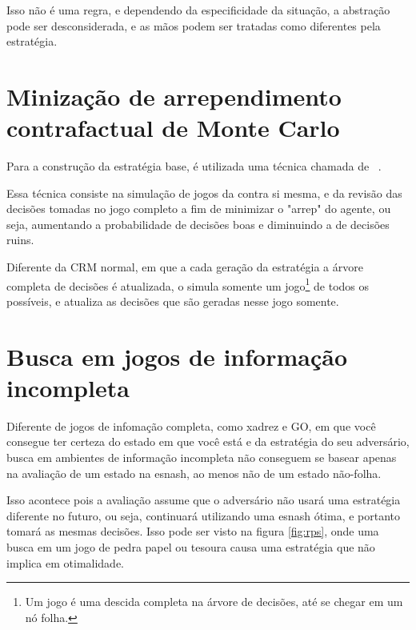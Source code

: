 \documentclass[twocolumn]{article}
\theoremstyle{mytheoremstyle}
\theoremstyle{mytheoremstyle}
\theoremstyle{myproblemstyle}
\begin{document}
            Isso não é uma regra, e dependendo da especificidade da situação, a abstração pode ser desconsiderada, e as mãos podem ser tratadas como
            diferentes pela estratégia.



    \section{Minização de arrependimento contrafactual de Monte Carlo} %
    \label{sec:Minização de arrependimento contrafactual de Monte Carlo}
        Para a construção da estratégia base, é utilizada uma técnica chamada de ~\cite{NIPS2009_00411460,brown2019solving}.

        Essa técnica consiste na simulação de jogos da  contra si mesma, e da revisão das decisões tomadas no jogo completo a fim de minimizar o "\gls{arrep}"
        do agente, ou seja, aumentando a probabilidade de decisões boas e diminuindo a de decisões ruins.

        Diferente da CRM normal, em que a cada geração da estratégia a árvore completa de decisões é atualizada, o  simula somente um jogo\footnote{Um jogo é uma descida
        completa na árvore de decisões, até se chegar em um nó folha.} de todos os possíveis, e atualiza as decisões que são geradas nesse jogo somente.


    \section{Busca em jogos de informação incompleta} %
    \label{sec:Busca em Jogos de informação incompleta}

        Diferente de jogos de infomação completa, como xadrez e GO, em que você consegue ter certeza do estado em que você está e da estratégia do seu adversário,
        busca em ambientes de informação incompleta não conseguem se basear apenas na avaliação de um estado na \gls{esnash}, ao menos não de um estado não-folha.

        Isso acontece pois a avaliação assume que o adversário não usará uma estratégia diferente no futuro, ou seja, continuará utilizando uma \gls{esnash}
        ótima, e portanto tomará as mesmas decisões. Isso pode ser visto na figura \ref{fig:rps}, onde uma busca em um jogo de pedra papel ou tesoura
        causa uma estratégia que não implica em otimalidade.
\end{document}

